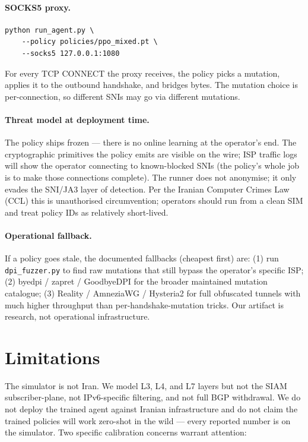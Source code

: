 \documentclass[letterpaper,twocolumn,10pt]{article}
\begin{document}
\paragraph{SOCKS5 proxy.}
{\small\begin{verbatim}
python run_agent.py \
    --policy policies/ppo_mixed.pt \
    --socks5 127.0.0.1:1080
\end{verbatim}}
For every TCP CONNECT the proxy receives, the policy picks a
mutation, applies it to the outbound handshake, and bridges bytes.
The mutation choice is per-connection, so different SNIs may go via
different mutations.

\paragraph{Threat model at deployment time.}
The policy ships frozen — there is no online learning at the
operator's end. The cryptographic primitives the policy emits are
visible on the wire; ISP traffic logs will show the operator
connecting to known-blocked SNIs (the policy's whole job is to make
those connections complete). The runner does not anonymise; it
only evades the SNI/JA3 layer of detection. Per the Iranian Computer
Crimes Law (CCL) this is unauthorised circumvention; operators
should run from a clean SIM and treat policy IDs as relatively
short-lived.

\paragraph{Operational fallback.}
If a policy goes stale, the documented fallbacks (cheapest first)
are: (1) run \texttt{dpi\_fuzzer.py} to find raw mutations that
still bypass the operator's specific ISP; (2) byedpi / zapret /
GoodbyeDPI for the broader maintained mutation catalogue; (3)
Reality / AmneziaWG / Hysteria2 for full obfuscated tunnels with
much higher throughput than per-handshake-mutation tricks. Our
artifact is research, not operational infrastructure.

\section{Limitations}
\label{sec:limitations}

The simulator is not Iran. We model L3, L4, and L7 layers but not the
SIAM subscriber-plane, not IPv6-specific filtering, and not full BGP
withdrawal. We do not deploy the trained agent against Iranian
infrastructure and do not claim the trained policies will work zero-shot
in the wild — every reported number is on the simulator. Two specific
calibration concerns warrant attention:
\end{document}
